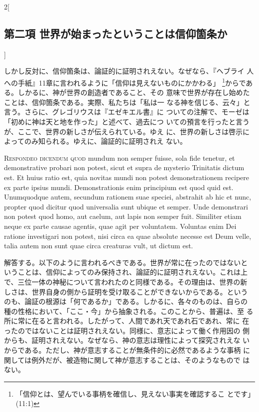 \documentclass[paper=a4paper,fontsize=10pt,jafontsize=9pt,titlepage]{jlreq}
\begin{document}
\begin{paracol}{2}[\subsection{第二項 世界が始まったということは信仰箇条か}]
\switchcolumn


しかし反対に、信仰箇条は、論証的に証明されえない。なぜなら、『ヘブライ
人への手紙』11章に言われるように「信仰は見えないものにかかわる」
\footnote{「信仰とは、望んでいる事柄を確信し、見えない事実を確認するこ
とです」(11:1)}からである。しかるに、神が世界の創造者であること、その
意味で世界が存在し始めたことは、信仰箇条である。実際、私たちは「私は一
なる神を信じる、云々」と言う。さらに、グレゴリウスは『エゼキエル書』に
ついての注解で、モーゼは「初めに神は天と地を作った」と述べて、過去につ
いての預言を行ったと言うが、ここで、世界の新しさが伝えられている。ゆえ
に、世界の新しさは啓示によってのみ知られる。ゆえに、論証的に証明されえ
ない。




{\scshape Respondeo dicendum quod} mundum non semper fuisse, sola fide
 tenetur, et demonstrative probari non potest, sicut et supra de
 mysterio Trinitatis dictum est. Et huius ratio est, quia novitas mundi
 non potest demonstrationem recipere ex parte ipsius
 mundi. Demonstrationis enim principium est quod quid est. Unumquodque
 autem, secundum rationem suae speciei, abstrahit ab hic et nunc,
 propter quod dicitur quod universalia sunt ubique et semper. Unde
 demonstrari non potest quod homo, aut caelum, aut lapis non semper
 fuit. Similiter etiam neque ex parte causae agentis, quae agit per
 voluntatem. Voluntas enim Dei ratione investigari non potest, nisi
 circa ea quae absolute necesse est Deum velle, talia autem non sunt
 quae circa creaturas vult, ut dictum est.


\switchcolumn


解答する。以下のように言われるべきである。世界が常に在ったのではないと
いうことは、信仰によってのみ保持され、論証的に証明されえない。これは上
で、三位一体の神秘について言われたのと同様である。その理由は、世界の新
しさは、世界自身の側から証明を受け取ることができないからである。という
のも、論証の根源は「何であるか」である。しかるに、各々のものは、自らの
種の性格において、「ここ・今」から抽象される。このことから、普遍は、至
る所に常に在ると言われる。したがって、人間であれ天であれ石であれ、常に
在ったのではないことは証明されえない。同様に、意志によって働く作用因の
側からも、証明されえない。なぜなら、神の意志は理性によって探究されえな
いからである。ただし、神が意志することが無条件的に必然であるような事柄
に関しては例外だが、被造物に関して神が意志することは、そのようなもので
はない。



\end{paracol}
\end{document}
